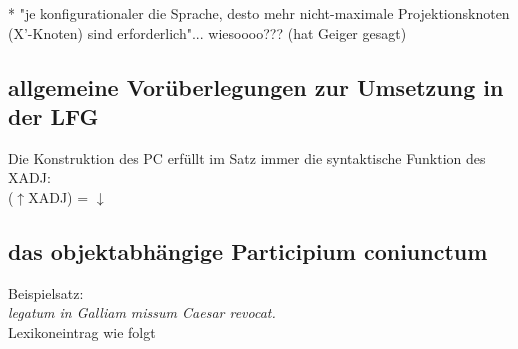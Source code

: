 \documentclass[12pt,a4paper]{article}
\begin{document}
* "je konfigurationaler die Sprache, desto mehr nicht-maximale Projektionsknoten (X'-Knoten) sind erforderlich"... wiesoooo??? (hat Geiger gesagt)

\subsection{allgemeine Vorüberlegungen zur Umsetzung in der LFG}
Die Konstruktion des PC erfüllt im Satz immer die syntaktische Funktion des XADJ: \\ 
($\uparrow$XADJ) = $\downarrow$ \\


\subsection{das objektabhängige Participium coniunctum}
Beispielsatz:\\
\textit{legatum in Galliam missum Caesar revocat.} \\
Lexikoneintrag wie folgt
\end{document}

